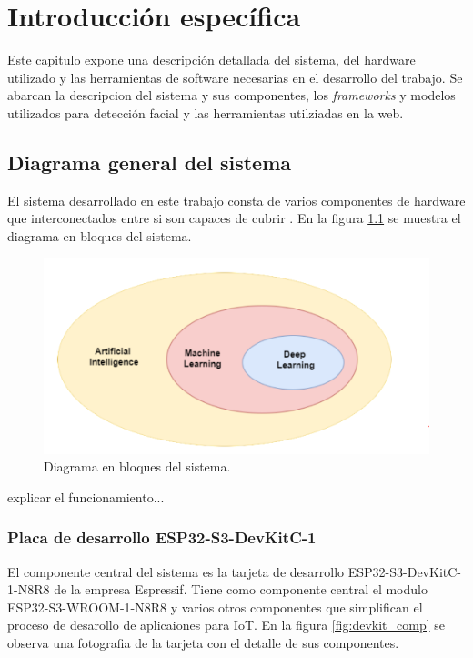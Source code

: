\chapter{Introducción específica} %

\label{Chapter2}

Este capitulo expone una descripción detallada del sistema, del hardware utilizado y las herramientas de  software necesarias en el desarrollo del trabajo. Se abarcan la descripcion del sistema y sus componentes, los \textit{frameworks} y modelos utilizados para detección facial y las herramientas utilziadas en la web.

\section{Diagrama general del sistema}
El sistema desarrollado en este trabajo consta de varios componentes de hardware que interconectados entre si son capaces de cubrir . En la figura \ref{fig:sys_blocks} se muestra el diagrama en bloques del sistema.

\begin{figure}[h]
	\centering
	\includegraphics[scale=0.3]{./Figures/ai_ml_dl.png}
	\caption{Diagrama en bloques del sistema.}
	\label{fig:sys_blocks}
\end{figure}

explicar el funcionamiento...

\subsection{Placa de desarrollo ESP32-S3-DevKitC-1}
El componente central del sistema es la tarjeta de desarrollo ESP32-S3-DevKitC-1-N8R8 de la empresa Espressif. Tiene como componente central el modulo ESP32-S3-WROOM-1-N8R8 y varios otros componentes que simplifican el proceso de desarollo de aplicaiones para IoT. En la figura \ref{fig:devkit_comp} se observa una fotografia de la tarjeta con el detalle de sus componentes.

